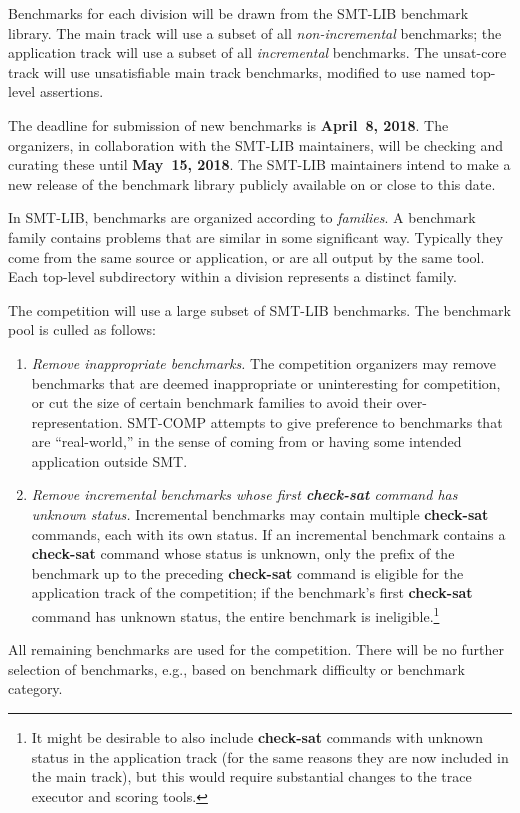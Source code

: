 \documentclass[12pt]{article}
\newcommand{\akey}[1]{\textbf{#1}}
\begin{document}
%
Benchmarks for each division will be drawn from the SMT-LIB benchmark
library.  The main track will use a subset of all
\emph{non-incremental} benchmarks; the application track will use a
subset of all \emph{incremental} benchmarks.  The unsat-core track
will use unsatisfiable main track benchmarks, modified to use named
top-level assertions.

%
The deadline for submission of new benchmarks is {\bf April~8, 2018}.
The organizers, in collaboration with the SMT-LIB maintainers, will be
checking and curating these until {\bf May~15, 2018}.  The SMT-LIB
maintainers intend to make a new release of the benchmark library
publicly available on or close to this date.

%
In SMT-LIB, benchmarks are organized according to \emph{families}.  A
benchmark family contains problems that are similar in some
significant way.  Typically they come from the same source or
application, or are all output by the same tool.  Each top-level
subdirectory within a division represents a distinct family.

%
The competition will use a large subset of SMT-LIB benchmarks.  The
benchmark pool is culled as follows:
\begin{enumerate}
\item \emph{Remove inappropriate benchmarks.} The competition
  organizers may remove benchmarks that are deemed inappropriate or
  uninteresting for competition, or cut the size of certain benchmark
  families to avoid their over-representation.  SMT-COMP attempts to
  give preference to benchmarks that are ``real-world,'' in the sense
  of coming from or having some intended application outside SMT.
\item \emph{Remove incremental benchmarks whose first \akey{check-sat}
  command has unknown status.}  Incremental benchmarks may contain
  multiple \akey{check-sat} commands, each with its own status.  If an
  incremental benchmark contains a \akey{check-sat} command whose
  status is unknown, only the prefix of the benchmark up to the
  preceding \akey{check-sat} command is eligible for the application
  track of the competition; if the benchmark's first \akey{check-sat}
  command has unknown status, the entire benchmark is
  ineligible.\footnote{It might be desirable to also include
    \akey{check-sat} commands with unknown status in the application
    track (for the same reasons they are now included in the main
    track), but this would require substantial changes to the trace
    executor and scoring tools.}
\end{enumerate}
%
All remaining benchmarks are used for the competition.  There will be
no further selection of benchmarks, e.g., based on benchmark
difficulty or benchmark category.
\end{document}
